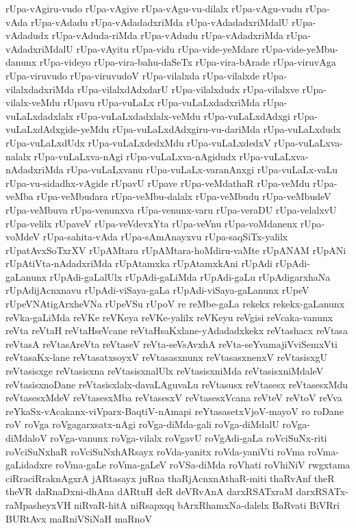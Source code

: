 {rUpa-vAgiru-vudo
rUpa-vAgive
rUpa-vAgu-vu-dilalx
rUpa-vAgu-vudu
rUpa-vAda
rUpa-vAdadu
rUpa-vAdadadxriMda
rUpa-vAdadadxriMdalU
rUpa-vAdadudx
rUpa-vAduda-riMda
rUpa-vAdudu
rUpa-vAdadxriMda
rUpa-vAdadxriMdalU
rUpa-vAyitu
rUpa-vidu
rUpa-vide-yeMdare
rUpa-vide-yeMbu-danunx
rUpa-videyo
rUpa-vira-bahu-daSeTx
rUpa-vira-bArade
rUpa-viruvAga
rUpa-viruvudo
rUpa-viruvudoV
rUpa-vilalxda
rUpa-vilalxde
rUpa-vilalxdadxriMda
rUpa-vilalxdAdxdarU
rUpa-vilalxdudx
rUpa-vilalxve
rUpa-vilalx-veMdu
rUpavu
rUpa-vuLaLx
rUpa-vuLaLxdadxriMda
rUpa-vuLaLxdadxlalx
rUpa-vuLaLxdadxlalx-veMdu
rUpa-vuLaLxdAdxgi
rUpa-vuLaLxdAdxgide-yeMdu
rUpa-vuLaLxdAdxgiru-vu-dariMda
rUpa-vuLaLxdudx
rUpa-vuLaLxdUdx
rUpa-vuLaLxdedxMdu
rUpa-vuLaLxdedxV
rUpa-vuLaLxva-nalalx
rUpa-vuLaLxva-nAgi
rUpa-vuLaLxva-nAgidudx
rUpa-vuLaLxva-nAdadxriMda
rUpa-vuLaLxvanu
rUpa-vuLaLx-varanAnxgi
rUpa-vuLaLx-vaLu
rUpa-vu-sidadhx-vAgide
rUpavU
rUpave
rUpa-veMdathaR
rUpa-veMdu
rUpa-veMba
rUpa-veMbudara
rUpa-veMbu-dalalx
rUpa-veMbudu
rUpa-veMbudeV
rUpa-veMbuva
rUpa-venunxva
rUpa-venunx-varu
rUpa-veraDU
rUpa-velalxvU
rUpa-velilx
rUpaveV
rUpa-veVdevxYta
rUpa-veVnu
rUpa-voMdanenx
rUpa-voMdeV
rUpa-sahita-vAda
rUpa-sAmAnayxvu
rUpa-saqSiTx-yalilx
rUpatAvxSoTxrXV
rUpAMtara
rUpAMtara-hoMdiru-vaMte
rUpANAM
rUpANi
rUpAtiVta-nAdadxriMda
rUpAtamxka
rUpAtamxkAni
rUpAdi
rUpAdi-gaLanunx
rUpAdi-gaLalUlx
rUpAdi-gaLiMda
rUpAdi-gaLu
rUpAdigarxhaNa
rUpAdijAcnxnavu
rUpAdi-viSaya-gaLa
rUpAdi-viSaya-gaLanunx
rUpeV
rUpeVNAtigArxheVNa
rUpeVSu
rUpoV
re
reMbe-gaLa
rekekx
rekekx-gaLanunx
reVka-gaLiMda
reVKe
reVKeya
reVKe-yalilx
reVKeyu
reVgisi
reVcaka-vanunx
reVta
reVtaH
reVtaHseVcane
reVtaHsaKxlane-yAdadadxkekx
reVtashacx
reVtasa
reVtasA
reVtasAreVta
reVtaseV
reVta-seVsAvxhA
reVta-seYvamajiVviSemxVti
reVtasaKx-lane
reVtasatxsoyxV
reVtasasxnunx
reVtasasxnenxV
reVtasisxgU
reVtasisxge
reVtasisxna
reVtasisxnalUlx
reVtasisxniMda
reVtasisxniMdaleV
reVtasisxnoDane
reVtasisxlalx-davaLAguvaLu
reVtasusx
reVtasesx
reVtasesxMdu
reVtasesxMdeV
reVtasesxMba
reVtasesxV
reVtasesxVcana
reVteV
reVtoV
reVva
reYkaSx-vAcakanx-viVparx-BaqtiV-nAmapi
reYtasasetxVjoV-mayoV
ro
roDane
roV
roVga
roVgagarxsatx-nAgi
roVga-diMda-gali
roVga-diMdalU
roVga-diMdaloV
roVga-vanunx
roVga-vilalx
roVgavU
roVgAdi-gaLa
roVciSuNx-riti
roVciSuNxhaR
roVciSuNxhARsayx
roVda-yanitx
roVda-yaniVti
roVma
roVma-gaLidadxre
roVma-gaLe
roVma-gaLeV
roVSa-diMda
roVhati
roVhiNiV
rwgxtama
ciRraciRraknAgxrA
jARtasayx
juRna
thaRjAcnxnAthaR-miti
thaRvAnf
theR
theVR
daRnaDxni-dhAna
dARtuH
deR
deVRvAnA
darxRSATxraM
darxRSATx-raMpasheyxVH
niRvaR-hitA
niRsapxqq
bArxRhamxNa-dalelx
BaRvati
BiVRri
BURtAvx
maRniVSiNaH
maRnoV
}
